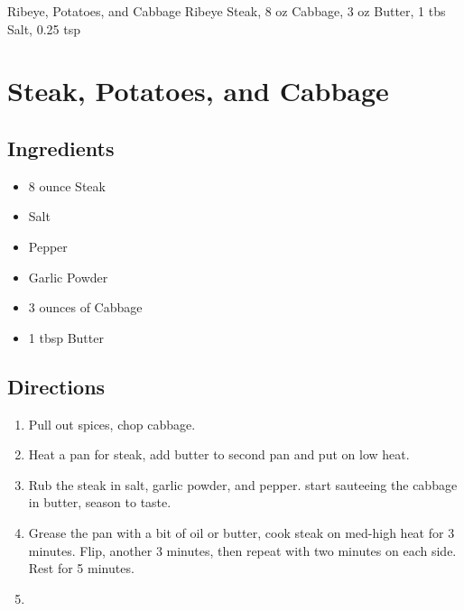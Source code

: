 Ribeye, Potatoes, and Cabbage
  Ribeye Steak, 8 oz
  Cabbage, 3 oz
  Butter, 1 tbs
  Salt, 0.25 tsp

\section{ Steak, Potatoes, and Cabbage }

\subsection{ Ingredients }

\begin{itemize}
  \item 8 ounce Steak
  \item Salt
  \item Pepper
  \item Garlic Powder
  \item 3 ounces of Cabbage
  \item 1 tbsp Butter
\end{itemize}

\subsection{ Directions }

\begin{enumerate}
  \item Pull out spices, chop cabbage. 
  \item Heat a pan for steak, add butter to second pan and put on low heat. 
  \item Rub the steak in salt, garlic powder, and pepper. start sauteeing the cabbage in butter, season to taste. 
  \item Grease the pan with a bit of oil or butter, cook steak on med-high heat for 3 minutes. Flip, another 3 minutes, then repeat with two minutes on each side. Rest for 5 minutes. 
  \item 
\end{enumerate}

